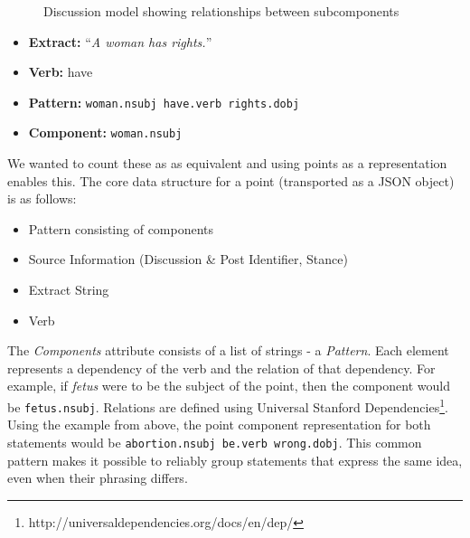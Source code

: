     \begin{figure}
      \centering
      \caption{Discussion model showing relationships between subcomponents}

      \label{fig:discmod}
    \end{figure}

	\begin{itemize}
	  \item[]{\textbf{Extract:} ``\textit{A woman has rights.}''}
	  \item[]{\textbf{Verb:} have}
	  \item[]{\textbf{Pattern:} \texttt{woman.nsubj have.verb rights.dobj}}
	  \item[]{\textbf{Component:} \texttt{woman.nsubj}}
	\end{itemize}

    We wanted to count these as as equivalent and using points as a representation enables this. The core data structure for a point (transported as a JSON object) is as follows:

    \begin{itemize}
      \item{Pattern consisting of components}
      \item{Source Information (Discussion \& Post Identifier, Stance)}
      \item{Extract String}
      \item{Verb}
    \end{itemize}

    The \textit{Components} attribute consists of a list of strings - a \textit{Pattern}. Each element represents a dependency of the verb and the relation of that dependency. For example, if \textit{fetus} were to be the subject of the point, then the component would be \texttt{fetus.nsubj}. Relations are defined using Universal Stanford Dependencies\footnote{http://universaldependencies.org/docs/en/dep/}. Using the example from above, the point component representation for both statements would be \texttt{abortion.nsubj be.verb wrong.dobj}. This common pattern makes it possible to reliably group statements that express the same idea, even when their phrasing differs.

